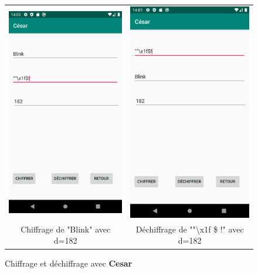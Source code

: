 \documentclass{article}
\begin{document}
\begin{figure}[b!]
    \centering
    \begin{tabular}{cc}
      \includegraphics[width=.35\linewidth]{./img/cesar_e.png} &
      \includegraphics[width=.35\linewidth]{./img/cesar_d.png} \\
      Chiffrage de "Blink" avec d=182 & Déchiffrage de ""\textbackslash x1f \$ !" avec d=182\\
    \end{tabular}
    \caption{Chiffrage et déchiffrage avec \textbf{Cesar}}\label{fig:cesar}
\end{figure}
\end{document}

